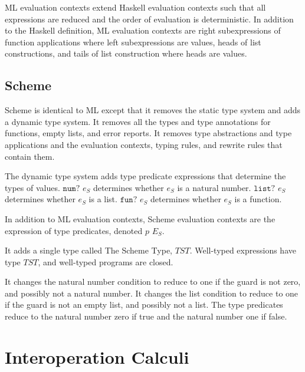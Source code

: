 ML evaluation contexts extend Haskell evaluation contexts such that all expressions are reduced and the order of evaluation is deterministic.  In addition to the Haskell definition, ML evaluation contexts are right subexpressions of function applications where left subexpressions are values, heads of list constructions, and tails of list construction where heads are values.

\subsection{Scheme}

Scheme is identical to ML except that it removes the static type system and adds a dynamic type system.  It removes all the types and type annotations for functions, empty lists, and error reports.  It removes type abstractions and type applications and the evaluation contexts, typing rules, and rewrite rules that contain them.

The dynamic type system adds type predicate expressions that determine the types of values.  $\mathtt{num?}$ $e_{S}$ determines whether $e_{S}$ is a natural number.  $\mathtt{list?}$ $e_{S}$ determines whether $e_{S}$ is a list.  $\mathtt{fun?}$ $e_{S}$ determines whether $e_{S}$ is a function.

In addition to ML evaluation contexts, Scheme evaluation contexts are the expression of type predicates, denoted $p$ $E_{S}$.

It adds a single type called The Scheme Type, $TST$.  Well-typed expressions have type $TST$, and well-typed programs are closed.

It changes the natural number condition to reduce to one if the guard is not zero, and possibly not a natural number.  It changes the list condition to reduce to one if the guard is not an empty list, and possibly not a list.  The type predicates reduce to the natural number zero if true and the natural number one if false.











\clearpage

\section{Interoperation Calculi}


